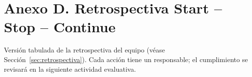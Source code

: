 \section*{Anexo D. Retrospectiva Start -- Stop -- Continue}

Versi\'on tabulada de la retrospectiva del equipo (v\'ease Secci\'on~\ref{sec:retrospectiva}). Cada acci\'on tiene un responsable; el cumplimiento se revisar\'a en la siguiente actividad evaluativa.

\vspace{0.3cm}
